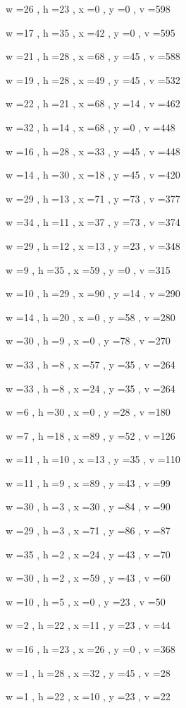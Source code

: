 \documentclass[11pt]{article}
\begin{document}
w =26 , h =23 , x =0 , y =0 , v =598
\par
w =17 , h =35 , x =42 , y =0 , v =595
\par
w =21 , h =28 , x =68 , y =45 , v =588
\par
w =19 , h =28 , x =49 , y =45 , v =532
\par
w =22 , h =21 , x =68 , y =14 , v =462
\par
w =32 , h =14 , x =68 , y =0 , v =448
\par
w =16 , h =28 , x =33 , y =45 , v =448
\par
w =14 , h =30 , x =18 , y =45 , v =420
\par
w =29 , h =13 , x =71 , y =73 , v =377
\par
w =34 , h =11 , x =37 , y =73 , v =374
\par
w =29 , h =12 , x =13 , y =23 , v =348
\par
w =9 , h =35 , x =59 , y =0 , v =315
\par
w =10 , h =29 , x =90 , y =14 , v =290
\par
w =14 , h =20 , x =0 , y =58 , v =280
\par
w =30 , h =9 , x =0 , y =78 , v =270
\par
w =33 , h =8 , x =57 , y =35 , v =264
\par
w =33 , h =8 , x =24 , y =35 , v =264
\par
w =6 , h =30 , x =0 , y =28 , v =180
\par
w =7 , h =18 , x =89 , y =52 , v =126
\par
w =11 , h =10 , x =13 , y =35 , v =110
\par
w =11 , h =9 , x =89 , y =43 , v =99
\par
w =30 , h =3 , x =30 , y =84 , v =90
\par
w =29 , h =3 , x =71 , y =86 , v =87
\par
w =35 , h =2 , x =24 , y =43 , v =70
\par
w =30 , h =2 , x =59 , y =43 , v =60
\par
w =10 , h =5 , x =0 , y =23 , v =50
\par
w =2 , h =22 , x =11 , y =23 , v =44
\par
w =16 , h =23 , x =26 , y =0 , v =368
\par
w =1 , h =28 , x =32 , y =45 , v =28
\par
w =1 , h =22 , x =10 , y =23 , v =22
\par
\newpage
\end{document}
